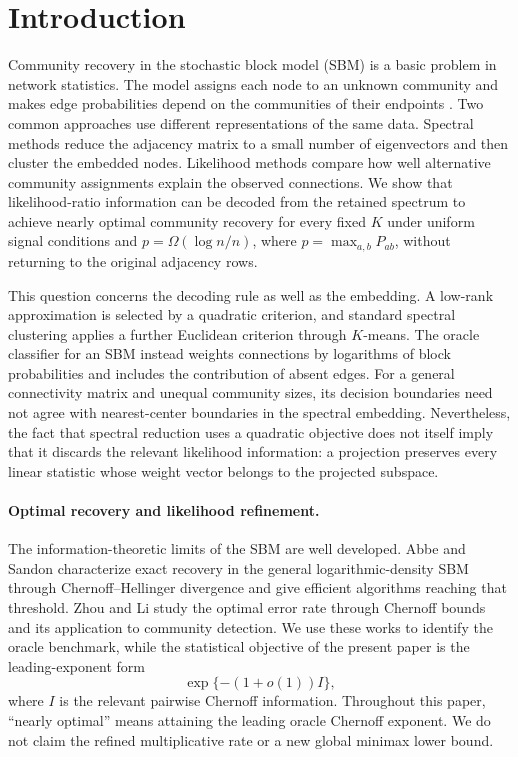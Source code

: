 \section{Introduction}\label{sec:introduction}

Community recovery in the stochastic block model (SBM) is a basic problem in network statistics. The model assigns each node to an unknown community and makes edge probabilities depend on the communities of their endpoints \cite{holland1983}. Two common approaches use different representations of the same data. Spectral methods reduce the adjacency matrix to a small number of eigenvectors and then cluster the embedded nodes. Likelihood methods compare how well alternative community assignments explain the observed connections. We show that likelihood-ratio information can be decoded from the retained spectrum to achieve nearly optimal community recovery for every fixed $K$ under uniform signal conditions and $p=\Omega(\log n/n)$, where $p=\max_{a,b}P_{ab}$, without returning to the original adjacency rows.

This question concerns the decoding rule as well as the embedding. A low-rank approximation is selected by a quadratic criterion, and standard spectral clustering applies a further Euclidean criterion through $K$-means. The oracle classifier for an SBM instead weights connections by logarithms of block probabilities and includes the contribution of absent edges. For a general connectivity matrix and unequal community sizes, its decision boundaries need not agree with nearest-center boundaries in the spectral embedding. Nevertheless, the fact that spectral reduction uses a quadratic objective does not itself imply that it discards the relevant likelihood information: a projection preserves every linear statistic whose weight vector belongs to the projected subspace.

\paragraph{Optimal recovery and likelihood refinement.}
The information-theoretic limits of the SBM are well developed. Abbe and Sandon \cite{abbe2015} characterize exact recovery in the general logarithmic-density SBM through Chernoff--Hellinger divergence and give efficient algorithms reaching that threshold. Zhou and Li \cite{zhouli2020} study the optimal error rate through Chernoff bounds and its application to community detection. We use these works to identify the oracle benchmark, while the statistical objective of the present paper is the leading-exponent form
\[
    \exp\{-(1+o(1))I\},
\]
where $I$ is the relevant pairwise Chernoff information. Throughout this paper, ``nearly optimal'' means attaining the leading oracle Chernoff exponent. We do not claim the refined multiplicative rate or a new global minimax lower bound.


